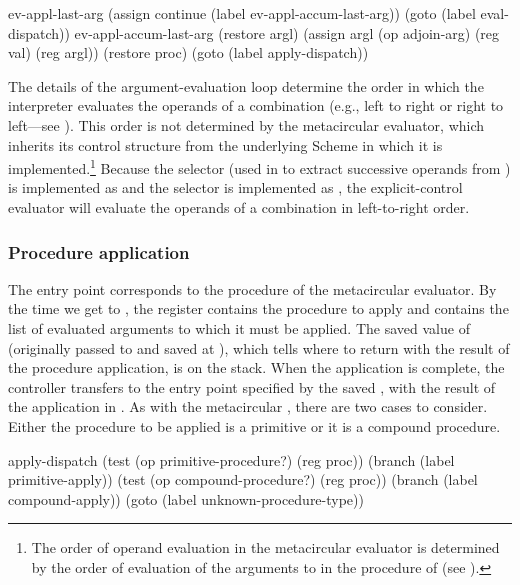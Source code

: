 \begin{codeBlock}
ev-appl-last-arg
  (assign continue (label ev-appl-accum-last-arg))
  (goto (label eval-dispatch))
ev-appl-accum-last-arg
  (restore argl)
  (assign argl (op adjoin-arg) (reg val) (reg argl))
  (restore proc)
  (goto (label apply-dispatch))
\end{codeBlock}

\noindent
The details of the argument-evaluation loop determine the order in which the
interpreter evaluates the operands of a combination (e.g., left to right or
right to left---see ).  This order is not determined by the
metacircular evaluator, which inherits its control structure from the
underlying Scheme in which it is implemented.\footnote{The order of operand
evaluation in the metacircular evaluator is determined by the order of
evaluation of the arguments to  in the procedure
 of  (see ).} Because
the  selector (used in  to
extract successive operands from ) is implemented as  and
the  selector is implemented as , the
explicit-control evaluator will evaluate the operands of a combination in
left-to-right order.

\subsubsection*{Procedure application}

The entry point  corresponds to the  procedure
of the metacircular evaluator.  By the time we get to ,
the  register contains the procedure to apply and 
contains the list of evaluated arguments to which it must be applied.  The
saved value of  (originally passed to  and
saved at ), which tells where to return with the result of
the procedure application, is on the stack.  When the application is complete,
the controller transfers to the entry point specified by the saved
, with the result of the application in .  As with the
metacircular , there are two cases to consider.  Either the
procedure to be applied is a primitive or it is a compound procedure.

\begin{codeBlock}
apply-dispatch
  (test (op primitive-procedure?) (reg proc))
  (branch (label primitive-apply))
  (test (op compound-procedure?) (reg proc))
  (branch (label compound-apply))
  (goto (label unknown-procedure-type))
\end{codeBlock}

